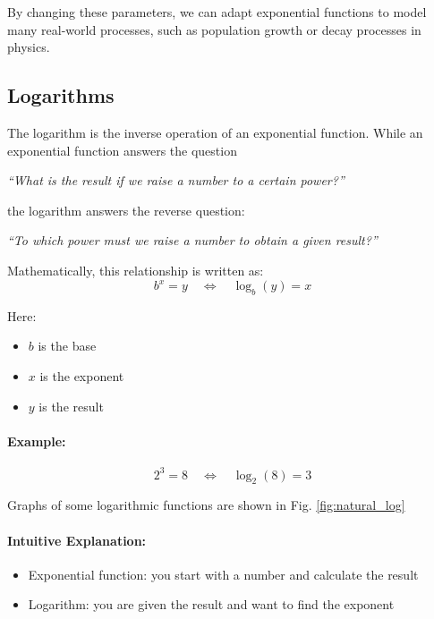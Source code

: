 By changing these parameters, we can adapt exponential functions to model many real-world processes, such as population growth or decay processes in physics.


\subsection{Logarithms}

The logarithm is the inverse operation of an exponential function. While an exponential function answers the question

\begin{center}
    \textit{``What is the result if we raise a number to a certain power?''}
\end{center}

the logarithm answers the reverse question:

\begin{center}
    \textit{``To which power must we raise a number to obtain a given result?''}
\end{center}

Mathematically, this relationship is written as:
\begin{equation}
    b^x = y \quad \Longleftrightarrow \quad \log_b(y) = x
\end{equation}

Here:
\begin{itemize}
    \item $b$ is the base
    \item $x$ is the exponent
    \item $y$ is the result
\end{itemize}

\paragraph{Example:}
\begin{equation}
    2^3 = 8 \quad \Longleftrightarrow \quad \log_2(8) = 3
\end{equation}

Graphs of some logarithmic functions are shown in Fig. \ref{fig:natural_log}

\paragraph{Intuitive Explanation:}
\begin{itemize}
    \item Exponential function: you start with a number and calculate the result
    \item Logarithm: you are given the result and want to find the exponent
\end{itemize}

